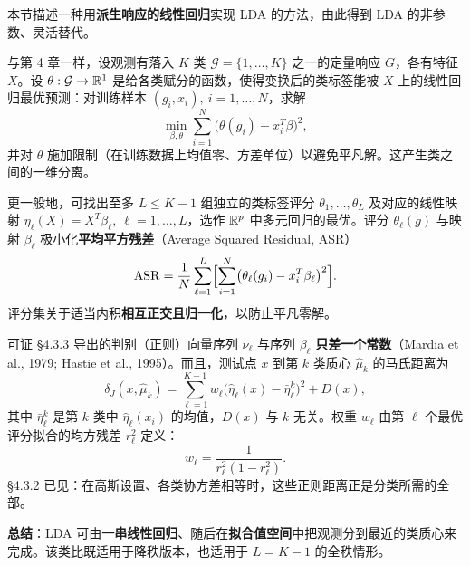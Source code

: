 本节描述一种用\textbf{派生响应的线性回归}实现 LDA 的方法，由此得到 LDA 的非参数、灵活替代。

\begin{definition}
与第 4 章一样，设观测有落入 $K$ 类 $\mathcal{G}=\{1,\dots,K\}$ 之一的定量响应 $G$，各有特征 $X$。设 $\theta:\mathcal{G}\to\mathbb{R}^1$ 是给各类赋分的函数，使得变换后的类标签能被 $X$ 上的线性回归最优预测：对训练样本 $(g_i,x_i),\ i=1,\dots,N$，求解
\begin{equation}
\min_{\beta,\theta} \sum_{i=1}^{N}\bigl(\theta(g_i) - x_i^T\beta\bigr)^2, \label{eq:12_52}
\end{equation}
并对 $\theta$ 施加限制（在训练数据上均值零、方差单位）以避免平凡解。这产生类之间的一维分离。
\end{definition}

更一般地，可找出至多 $L\le K-1$ 组独立的类标签评分 $\theta_1,\dots,\theta_L$ 及对应的线性映射 $\eta_\ell(X)=X^T\beta_\ell,\ \ell=1,\dots,L$，选作 $\mathbb{R}^p$ 中多元回归的最优。评分 $\theta_\ell(g)$ 与映射 $\beta_\ell$ 极小化\textbf{平均平方残差}（Average Squared Residual, ASR）
\begin{equation}
\mathrm{ASR} = \frac{1}{N}\sum_{\ell=1}^{L}\Bigl[\sum_{i=1}^{N}\bigl(\theta_\ell(g_i) - x_i^T\beta_\ell\bigr)^2\Bigr]. \label{eq:12_53}
\end{equation}
评分集关于适当内积\textbf{相互正交且归一化}，以防止平凡零解。

\begin{remark}[为什么走这条路？]
可证 §4.3.3 导出的判别（正则）向量序列 $\nu_\ell$ 与序列 $\beta_\ell$ \textbf{只差一个常数}（Mardia et al., 1979; Hastie et al., 1995）。而且，测试点 $x$ 到第 $k$ 类质心 $\hat\mu_k$ 的马氏距离为
\begin{equation}
\delta_J(x,\hat\mu_k) = \sum_{\ell=1}^{K-1} w_\ell\bigl(\hat\eta_\ell(x) - \bar\eta_\ell^k\bigr)^2 + D(x), \label{eq:12_54}
\end{equation}
其中 $\bar\eta_\ell^k$ 是第 $k$ 类中 $\hat\eta_\ell(x_i)$ 的均值，$D(x)$ 与 $k$ 无关。权重 $w_\ell$ 由第 $\ell$ 个最优评分拟合的均方残差 $r_\ell^2$ 定义：
\begin{equation}
w_\ell = \frac{1}{r_\ell^2(1-r_\ell^2)}. \label{eq:12_55}
\end{equation}
§4.3.2 已见：在高斯设置、各类协方差相等时，这些正则距离正是分类所需的全部。
\end{remark}

\textbf{总结}：LDA 可由\textbf{一串线性回归}、随后在\textbf{拟合值空间}中把观测分到最近的类质心来完成。该类比既适用于降秩版本，也适用于 $L=K-1$ 的全秩情形。

